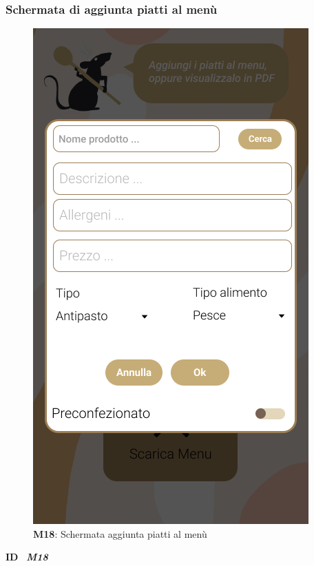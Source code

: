                     \subsubsection{Schermata di aggiunta piatti al menù}
                        \begin{figure}[H]
                          \centering
                          \includegraphics[scale=0.5]{assets/Mockup/Mockup_AddPlate.png}
                          \caption*{\textbf{M18}: Schermata aggiunta piatti al menù}\label{fig:Mockup_AddPlate}
                        \end{figure}
              
                        \begin{flushleft}
                          \textbf{ID}   \ \Large{\textit{\textbf{M18}}}
                        \end{flushleft}
              
